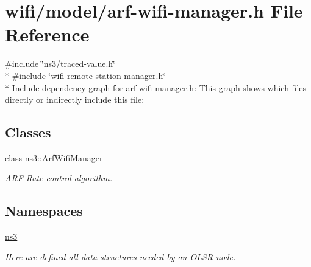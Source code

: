 \hypertarget{arf-wifi-manager_8h}{}\section{wifi/model/arf-\/wifi-\/manager.h File Reference}
\label{arf-wifi-manager_8h}
{\ttfamily \#include \char`\"{}ns3/traced-\/value.\+h\char`\"{}}\\*
{\ttfamily \#include \char`\"{}wifi-\/remote-\/station-\/manager.\+h\char`\"{}}\\*
Include dependency graph for arf-\/wifi-\/manager.h\+:
This graph shows which files directly or indirectly include this file\+:
\subsection*{Classes}
\begin{DoxyCompactItemize}
\item 
class \hyperlink{classns3_1_1ArfWifiManager}{ns3\+::\+Arf\+Wifi\+Manager}
\begin{DoxyCompactList}\small\item\em A\+RF Rate control algorithm. \end{DoxyCompactList}\end{DoxyCompactItemize}
\subsection*{Namespaces}
\begin{DoxyCompactItemize}
\item 
 \hyperlink{namespacens3}{ns3}
\begin{DoxyCompactList}\small\item\em Here are defined all data structures needed by an O\+L\+SR node. \end{DoxyCompactList}\end{DoxyCompactItemize}
